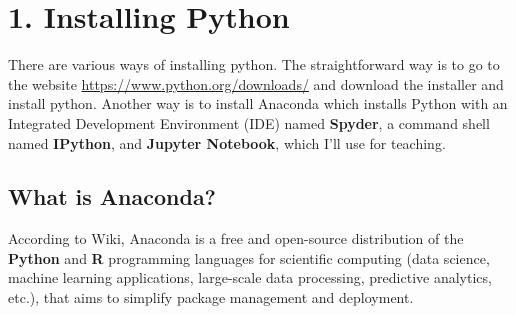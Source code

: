 \documentclass[11pt]{article}
\title{\exerciseset}
\author{\studentname \qquad x500: \suid}
\begin{document}
	\maketitle
	
	\section*{1. Installing Python}
	There are various ways of installing python. The straightforward way is to go to the website \href{https://www.python.org/downloads/}{https://www.python.org/downloads/} and download the installer and install python. Another way is to install Anaconda which installs Python with an Integrated Development Environment (IDE) named \textbf{Spyder}, a command shell named \textbf{IPython}, and \textbf{Jupyter Notebook}, which I'll use for teaching.
	
	\subsection*{What is Anaconda?}
	According to Wiki, Anaconda is a free and open-source distribution of the \textbf{Python} and \textbf{R} programming languages for scientific computing (data science, machine learning applications, large-scale data processing, predictive analytics, etc.), that aims to simplify package management and deployment. 
	
\end{document}
